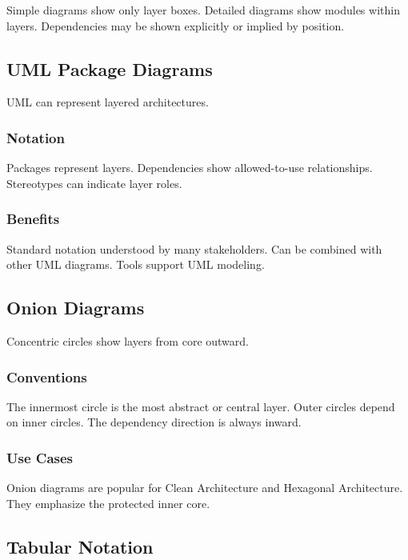 \documentclass[11pt]{article}
\begin{document}
Simple diagrams show only layer boxes. Detailed diagrams show modules within layers. Dependencies may be shown explicitly or implied by position.

\subsection{UML Package Diagrams}

UML can represent layered architectures.

\subsubsection{Notation}

Packages represent layers. Dependencies show allowed-to-use relationships. Stereotypes can indicate layer roles.

\subsubsection{Benefits}

Standard notation understood by many stakeholders. Can be combined with other UML diagrams. Tools support UML modeling.

\subsection{Onion Diagrams}

Concentric circles show layers from core outward.

\subsubsection{Conventions}

The innermost circle is the most abstract or central layer. Outer circles depend on inner circles. The dependency direction is always inward.

\subsubsection{Use Cases}

Onion diagrams are popular for Clean Architecture and Hexagonal Architecture. They emphasize the protected inner core.

\subsection{Tabular Notation}
\end{document}

